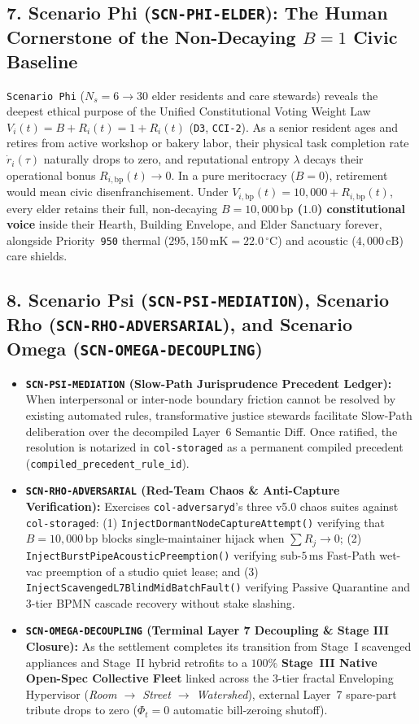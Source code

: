 \subsection{7. Scenario Phi (\texttt{SCN-PHI-ELDER}): The Human Cornerstone of the Non-Decaying $B=1$ Civic Baseline}
\texttt{Scenario Phi} ($N_s = 6 \to 30$ elder residents and care stewards) reveals the deepest ethical purpose of the Unified Constitutional Voting Weight Law $V_i(t) = B + R_i(t) = 1 + R_i(t)$ (\texttt{D3}, \texttt{CCI-2}). As a senior resident ages and retires from active workshop or bakery labor, their physical task completion rate $\dot{r}_i(\tau)$ naturally drops to zero, and reputational entropy $\lambda$ decays their operational bonus $R_{i,\mathrm{bp}}(t) \to 0$. In a pure meritocracy ($B=0$), retirement would mean civic disenfranchisement. Under $V_{i,\mathrm{bp}}(t) = 10{,}000 + R_{i,\mathrm{bp}}(t)$, every elder retains their full, non-decaying \textbf{$B = 10{,}000\,\mathrm{bp}$ ($1.0$) constitutional voice} inside their Hearth, Building Envelope, and Elder Sanctuary forever, alongside Priority~\texttt{950} thermal ($295{,}150\,\mathrm{mK} = 22.0\,^\circ\mathrm{C}$) and acoustic ($4{,}000\,\mathrm{cB}$) care shields.

\subsection{8. Scenario Psi (\texttt{SCN-PSI-MEDIATION}), Scenario Rho (\texttt{SCN-RHO-ADVERSARIAL}), and Scenario Omega (\texttt{SCN-OMEGA-DECOUPLING})}
\begin{itemize}
    \item \textbf{\texttt{SCN-PSI-MEDIATION} (Slow-Path Jurisprudence Precedent Ledger):} When interpersonal or inter-node boundary friction cannot be resolved by existing automated rules, transformative justice stewards facilitate Slow-Path deliberation over the decompiled Layer~6 Semantic Diff. Once ratified, the resolution is notarized in \texttt{col-storaged} as a permanent compiled precedent (\texttt{compiled\_precedent\_rule\_id}).
    \item \textbf{\texttt{SCN-RHO-ADVERSARIAL} (Red-Team Chaos \& Anti-Capture Verification):} Exercises \texttt{col-adversaryd}'s three v5.0 chaos suites against \texttt{col-storaged}: (1) \texttt{InjectDormantNodeCaptureAttempt()} verifying that $B = 10{,}000\,\mathrm{bp}$ blocks single-maintainer hijack when $\sum R_j \to 0$; (2) \texttt{InjectBurstPipeAcousticPreemption()} verifying sub-$5\,\mathrm{ms}$ Fast-Path wet-vac preemption of a studio quiet lease; and (3) \texttt{InjectScavengedL7BlindMidBatchFault()} verifying Passive Quarantine and 3-tier BPMN cascade recovery without stake slashing.
    \item \textbf{\texttt{SCN-OMEGA-DECOUPLING} (Terminal Layer 7 Decoupling \& Stage III Closure):} As the settlement completes its transition from Stage~I scavenged appliances and Stage~II hybrid retrofits to a $100\%$ \textbf{Stage~III Native Open-Spec Collective Fleet} linked across the 3-tier fractal Enveloping Hypervisor (\textit{Room $\to$ Street $\to$ Watershed}), external Layer~7 spare-part tribute drops to zero ($\Phi_t = 0$ automatic bill-zeroing shutoff).
\end{itemize}

